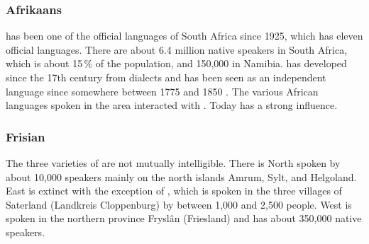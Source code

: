 
\subsubsection{Afrikaans}

 has been one of the official languages of South Africa since 1925, which has eleven official languages.
There are about 6.4 million native speakers in South Africa, which is about 15\,\% of the population,
and 150,000 in Namibia.  has developed since the 17th century from  dialects and has
been seen as an independent language since somewhere between 1775 and 1850 
\citep[]{denBesten2012a-u}.
The various African languages spoken in the area interacted with .
Today  has a strong influence.



\subsubsection{Frisian}

The three varieties of  are not mutually intelligible. There is North  spoken by
about 10,000 speakers mainly on the north  islands Amrum, Sylt, and Helgoland. East 
is extinct with the exception of , which is spoken in the three villages of Saterland
(Landkreis Cloppenburg) by between 1,000 and 2,500 people.
West  is spoken in the northern  province Fryslân (Friesland) and has about 350,000
native speakers.



